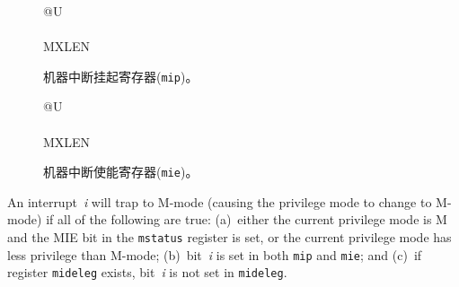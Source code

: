 \begin{figure}[h!]
{\footnotesize
\begin{center}
\begin{tabular}{@{}U}
 \\
\hline
{} \\
\hline
MXLEN \\
\end{tabular}
\end{center}
}
\vspace{-0.1in}
\caption{机器中断挂起寄存器({\tt mip})。}
\label{mipreg}
\end{figure}


\begin{figure}[h!]
{\footnotesize
\begin{center}
\begin{tabular}{@{}U}
 \\
\hline
{} \\
\hline
MXLEN \\
\end{tabular}
\end{center}
}
\vspace{-0.1in}
\caption{机器中断使能寄存器({\tt mie})。}
\label{miereg}
\end{figure}

\iffalse
An interrupt~\textit{i} will trap to M-mode (causing the privilege mode
to change to M-mode) if all of the following are true:
(a)~either the current privilege mode is M and the MIE bit in the
{\tt mstatus} register is set, or the current privilege mode has less
privilege than M-mode;
(b)~bit~\textit{i} is set in both {\tt mip} and {\tt mie}; and
(c)~if register {\tt mideleg} exists, bit~\textit{i} is not set in
{\tt mideleg}.

